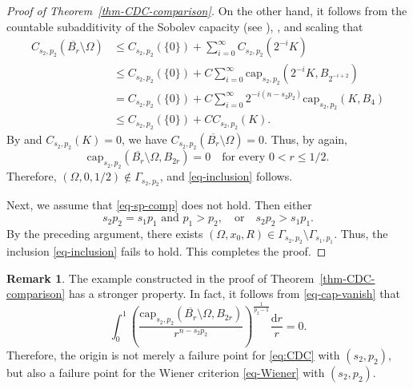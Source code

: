 \documentclass[11pt]{amsart}
\theoremstyle{plain}
\theoremstyle{definition}
\newtheorem{remark}[theorem]{Remark}
\numberwithin{equation}{section}
\begin{document}
\begin{proof}[Proof of Theorem~\ref{thm-CDC-comparison}]
On the other hand, it follows from the countable subadditivity of the Sobolev capacity (see \cite[Proposition~3.7]{BBK25}), \cite[Proposition~5.4]{BBK24}, and scaling that
\begin{align*}
C_{s_2, p_2}(\overline{B_r} \setminus \Omega)
&\leq C_{s_2, p_2}(\{0\}) + \sum_{i=0}^\infty C_{s_2, p_2}(2^{-i}K) \\
&\leq C_{s_2, p_2}(\{0\}) + C \sum_{i=0}^{\infty} \mathrm{cap}_{s_2, p_2}(2^{-i}K, B_{2^{-i+2}}) \\
&= C_{s_2, p_2}(\{0\}) + C \sum_{i=0}^{\infty} 2^{-i(n-s_2p_2)} \mathrm{cap}_{s_2, p_2}(K, B_{4}) \\
&\leq C_{s_2, p_2}(\{0\}) + C C_{s_2, p_2}(K).
\end{align*}
By \cite[Lemma~3.4]{BBK25} and $C_{s_2, p_2}(K)=0$, we have $C_{s_2, p_2}(\overline{B_r} \setminus \Omega)=0$. Thus, by \cite[Proposition~5.4]{BBK24} again,
\begin{equation}\label{eq-cap-vanish}
    \mathrm{cap}_{s_2,p_2}(\overline{B_r} \setminus \Omega, B_{2r})=0 \quad \text{for every }0<r\leq 1/2.
\end{equation}
Therefore, $(\Omega, 0, 1/2) \notin \Gamma_{s_2, p_2}$, and \eqref{eq-inclusion} follows.

Next, we assume that \eqref{eq-sp-comp} does not hold. Then either
\begin{equation*}
s_2p_2=s_1p_1\text{ and }p_1>p_2, \quad\text{or} \quad s_2p_2 > s_1p_1.
\end{equation*}
By the preceding argument, there exists $(\Omega , x_0, R) \in \Gamma_{s_2, p_2} \setminus \Gamma_{s_1, p_1}$. Thus, the inclusion \eqref{eq-inclusion} fails to hold. This completes the proof.
\end{proof}

\begin{remark}
The example constructed in the proof of Theorem~\ref{thm-CDC-comparison} has a stronger property. In fact, it follows from \eqref{eq-cap-vanish} that
\begin{equation*}
\int_0^1 \left(\frac{\mathrm{cap}_{s_2, p_2}(\overline{B_{r}} \setminus \Omega, B_{2r})}{r^{n-s_2p_2}} \right)^{\frac{1}{p_2-1}} \frac{\mathrm{d}r}{r} = 0.
\end{equation*}
Therefore, the origin is not merely a failure point for \eqref{eq:CDC} with $(s_2, p_2)$, but also a failure point for the Wiener criterion \eqref{eq-Wiener} with $(s_2, p_2)$.
\end{remark}
\end{document}
